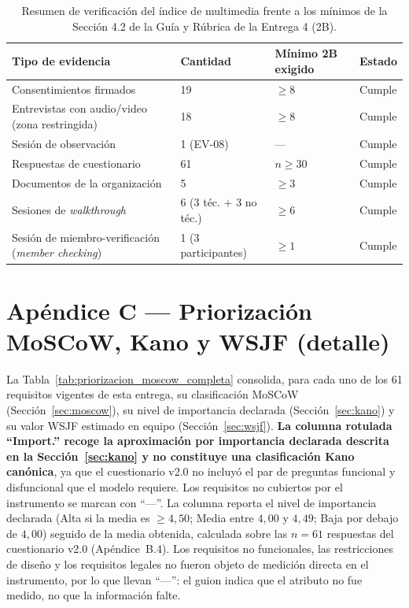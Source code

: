 \documentclass[journal,onecolumn]{IEEEtran}
\begin{document}
	\begin{table}[H]
		\centering
		\small
		\caption{Resumen de verificación del índice de multimedia frente a los mínimos de la Sección 4.2 de la Guía y Rúbrica de la Entrega 4 (2B).}
		\label{tab:resumen-verificacion-mm}
		\begin{tabularx}{\textwidth}{@{}X l l l@{}}
			\toprule
			\textbf{Tipo de evidencia} & \textbf{Cantidad} & \textbf{Mínimo 2B exigido} & \textbf{Estado} \\
			\midrule
			Consentimientos firmados & 19 & $\geq 8$ & Cumple \\
			Entrevistas con audio/video (zona restringida) & 18 & $\geq 8$ & Cumple \\
			Sesión de observación & 1 (EV-08) & --- & Cumple \\
			Respuestas de cuestionario & 61 & $n \geq 30$ & Cumple \\
			Documentos de la organización & 5 & $\geq 3$ & Cumple \\
			Sesiones de \emph{walkthrough} & 6 (3 téc. + 3 no téc.) & $\geq 6$ & Cumple \\
			Sesión de miembro-verificación (\emph{member checking}) & 1 (3 participantes) & $\geq 1$ & Cumple \\
			\bottomrule
		\end{tabularx}
	\end{table}
	
	\newpage
	\section*{Apéndice C --- Priorización MoSCoW, Kano y WSJF (detalle)}
	\label{ap:priorizacion}
	
	La Tabla~\ref{tab:priorizacion_moscow_completa} consolida, para cada uno de
	los 61 requisitos vigentes de esta entrega, su clasificación MoSCoW
	(Sección~\ref{sec:moscow}), su nivel de importancia declarada
	(Sección~\ref{sec:kano}) y su valor WSJF estimado en equipo
	(Sección~\ref{sec:wsjf}). \textbf{La columna rotulada \enquote{Import.}
		recoge la aproximación por importancia declarada descrita en la
		Sección~\ref{sec:kano} y no constituye una clasificación Kano canónica},
	ya que el cuestionario v2.0 no incluyó el par de preguntas funcional y
	disfuncional que el modelo requiere. Los requisitos no cubiertos por el
	instrumento se marcan con \enquote{---}. La columna reporta el nivel de
	importancia declarada (Alta si la media es $\geq 4{,}50$; Media entre
	$4{,}00$ y $4{,}49$; Baja por debajo de $4{,}00$) seguido de la media
	obtenida, calculada sobre las $n = 61$ respuestas del cuestionario v2.0
	(Apéndice~B.4). Los requisitos no funcionales, las restricciones de diseño y
	los requisitos legales no fueron objeto de medición directa en el
	instrumento, por lo que llevan \enquote{---}: el guion indica que el atributo
	no fue medido, no que la información falte.
	
\end{document}
